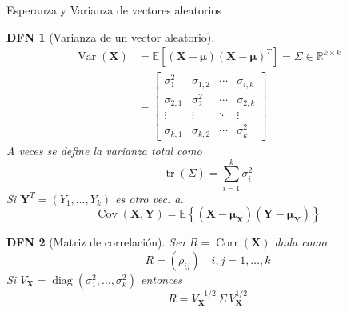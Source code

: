 \documentclass[a4paper]{article}
\newtheorem{definition}{DFN}
\theoremstyle{mytheoremstyle}
\newcommand{\R}{\mathbb{R}}
\newcommand{\E}{\mathbb{E}}
\newcommand{\1}{\mathds{1}}
\DeclareMathOperator{\Var}{Var}
\DeclareMathOperator{\cov}{Cov}
\DeclareMathOperator{\corr}{Corr}
\DeclareMathOperator{\tr}{tr}
\DeclareMathOperator{\diag}{diag}
\renewcommand{\vec}[1]{\boldsymbol{#1}}
\begin{document}
\begin{multicols*}{3}
\begin{roundbox}{Esperanza y Varianza de vectores aleatorios}
\begin{definition}[Varianza de un vector aleatorio]
    \begin{align*}
        \Var(\vec{X}) &= \E \left[ \left( \vec{X} - \vec{\mu} \right) \left( \vec{X} - \vec{\mu} \right)^{T} \right] = \Sigma \in \R^{k \times k} \\
        &= \begin{bmatrix}
            \sigma_1^{2} & \sigma_{1,2} & \cdots & \sigma_{i,k} \\
            \sigma_{2,1} & \sigma_{2}^{2} & \cdots & \sigma_{2,k} \\
            \vdots & \vdots & \ddots & \vdots \\
            \sigma_{k,1} & \sigma_{k,2} & \cdots & \sigma_{k}^{2}
        \end{bmatrix}
    \end{align*}
    A veces se define la varianza total como 
    \begin{equation*}
        \tr(\Sigma) = \sum_{i=1}^{k} \sigma_{i}^{2}
    \end{equation*}
    Si $\vec{Y}^{T} = (Y_1, \dots, Y_k)$ es otro vec. a.
    \begin{equation*}
        \cov(\vec{X}, \vec{Y}) = \E \left\{ \left( \vec{X} - \vec{\mu_{\vec{X}}} \right) \left( \vec{Y} - \vec{\mu_{\vec{Y}}} \right) \right\}
    \end{equation*}
\end{definition}

\begin{definition}[Matriz de correlación]
    Sea $R = \corr(\vec{X})$ dada como 
    \begin{equation*}
        R = (\rho_{ij}) \quad i,j = 1, \dots , k
    \end{equation*}
    Si $V_{\vec{X}} = \diag(\sigma_{1}^{2}, \dots , \sigma_{k}^{2})$ entonces 
    \begin{equation*}
        R = V_{\vec{X}}^{-1/2} \, \Sigma \,  V_{\vec{X}}^{1/2}
    \end{equation*}
\end{definition}
\end{roundbox}


\end{multicols*}
\end{document}
